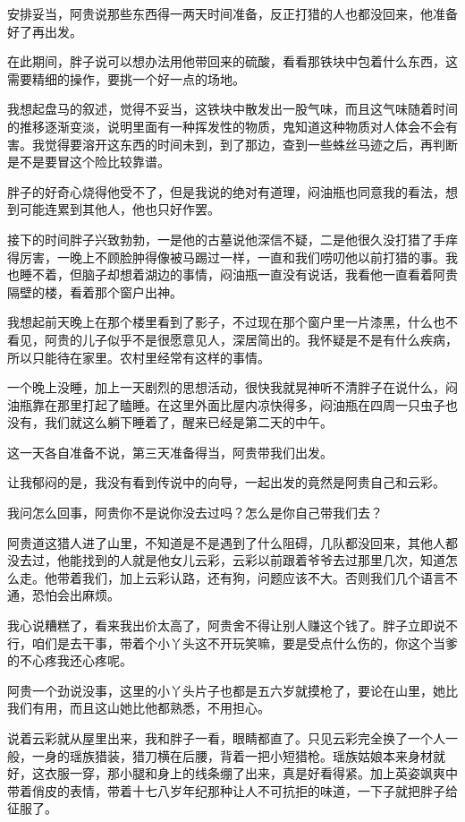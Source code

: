 安排妥当，阿贵说那些东西得一两天时间准备，反正打猎的人也都没回来，他准备好了再出发。

在此期间，胖子说可以想办法用他带回来的硫酸，看看那铁块中包着什么东西，这需要精细的操作，要挑一个好一点的场地。

我想起盘马的叙述，觉得不妥当，这铁块中散发出一股气味，而且这气味随着时间的推移逐渐变淡，说明里面有一种挥发性的物质，鬼知道这种物质对人体会不会有害。我觉得要溶开这东西的时间未到，到了那边，查到一些蛛丝马迹之后，再判断是不是要冒这个险比较靠谱。

胖子的好奇心烧得他受不了，但是我说的绝对有道理，闷油瓶也同意我的看法，想到可能连累到其他人，他也只好作罢。

接下的时间胖子兴致勃勃，一是他的古墓说他深信不疑，二是他很久没打猎了手痒得厉害，一晚上不顾脸肿得像被马踢过一样，一直和我们唠叨他以前打猎的事。我也睡不着，但脑子却想着湖边的事情，闷油瓶一直没有说话，我看他一直看着阿贵隔壁的楼，看着那个窗户出神。

我想起前天晚上在那个楼里看到了影子，不过现在那个窗户里一片漆黑，什么也不看见，阿贵的儿子似乎不是很愿意见人，深居简出的。我怀疑是不是有什么疾病，所以只能待在家里。农村里经常有这样的事情。

一个晚上没睡，加上一天剧烈的思想活动，很快我就晃神听不清胖子在说什么，闷油瓶靠在那里打起了瞌睡。在这里外面比屋内凉快得多，闷油瓶在四周一只虫子也没有，我们就这么躺下睡着了，醒来已经是第二天的中午。

这一天各自准备不说，第三天准备得当，阿贵带我们出发。

让我郁闷的是，我没有看到传说中的向导，一起出发的竟然是阿贵自己和云彩。

我问怎么回事，阿贵你不是说你没去过吗？怎么是你自己带我们去？

阿贵道这猎人进了山里，不知道是不是遇到了什么阻碍，几队都没回来，其他人都没去过，他能找到的人就是他女儿云彩，云彩以前跟着爷爷去过那里几次，知道怎么走。他带着我们，加上云彩认路，还有狗，问题应该不大。否则我们几个语言不通，恐怕会出麻烦。

我心说糟糕了，看来我出价太高了，阿贵舍不得让别人赚这个钱了。胖子立即说不行，咱们是去干事，带着个小丫头这不开玩笑嘛，要是受点什么伤的，你这个当爹的不心疼我还心疼呢。

阿贵一个劲说没事，这里的小丫头片子也都是五六岁就摸枪了，要论在山里，她比我们有用，而且这山她比他都熟悉，不用担心。

说着云彩就从屋里出来，我和胖子一看，眼睛都直了。只见云彩完全换了一个人一般，一身的瑶族猎装，猎刀横在后腰，背着一把小短猎枪。瑶族姑娘本来身材就好，这衣服一穿，那小腿和身上的线条绷了出来，真是好看得紧。加上英姿飒爽中带着俏皮的表情，带着十七八岁年纪那种让人不可抗拒的味道，一下子就把胖子给征服了。

